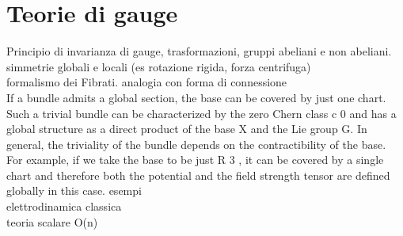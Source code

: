 \chapter{Teorie di gauge}
Principio di invarianza di gauge, trasformazioni, gruppi abeliani e non abeliani.\\
simmetrie globali e locali (es rotazione rigida, forza centrifuga)\\
formalismo dei Fibrati. analogia con forma di connessione\\
If a bundle admits a global section, the base can be covered by just one
chart. Such a trivial bundle can be characterized by the zero Chern class c 0
and has a global structure as a direct product of the base X and the Lie group
G. In general, the triviality of the bundle depends on the contractibility of
the base. For example, if we take the base to be just R 3 , it can be covered
by a single chart and therefore both the potential and the field strength
tensor are defined globally in this case.
esempi\\
elettrodinamica classica\\

teoria scalare O(n)\\
